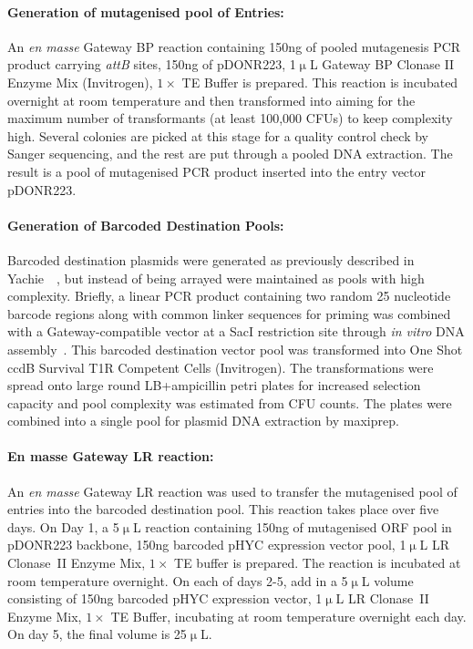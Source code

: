 \paragraph{Generation of mutagenised pool of Entries:} An \textit{en masse} Gateway BP reaction containing 150ng of pooled mutagenesis PCR product carrying \textit{attB} sites, 150ng of pDONR223, 1$\upmu$L Gateway BP Clonase II Enzyme Mix (Invitrogen), $1\times$ TE Buffer is prepared. This reaction is incubated overnight at room temperature and then transformed into  aiming for the maximum number of transformants (at least 100,000 CFUs) to keep complexity high. Several colonies are picked at this stage for a quality control check by Sanger sequencing, and the rest are put through a pooled DNA extraction. The result is a pool of mutagenised PCR product inserted into the entry vector pDONR223.

\paragraph{Generation of Barcoded Destination Pools:} Barcoded destination plasmids were generated as previously described in Yachie~\etal\ \cite{yachie_pooledmatrix_2016}, but instead of being arrayed were maintained as pools with high complexity. Briefly, a linear PCR product containing two random 25 nucleotide barcode regions along with common linker sequences for priming was combined with a Gateway-compatible vector at a SacI restriction site through \textit{in vitro} DNA assembly~\cite{gibson_enzymatic_2009}. This barcoded destination vector pool was transformed into One Shot ccdB Survival T1R Competent Cells (Invitrogen). The transformations were spread onto large round LB+ampicillin petri plates for increased selection capacity and pool complexity was estimated from CFU counts. The plates were combined into a single pool for plasmid DNA extraction by maxiprep.

\paragraph{En masse Gateway LR reaction:} An \textit{en masse} Gateway LR reaction was used to transfer the mutagenised pool of entries into the barcoded destination pool. This reaction takes place over five days. On Day 1, a 5$\upmu$L reaction containing 150ng of mutagenised ORF pool in pDONR223 backbone, 150ng barcoded pHYC expression vector pool, 1$\upmu$L LR Clonase II Enzyme Mix, $1\times$ TE buffer is prepared. The reaction is incubated at room temperature overnight. On each of days 2-5, add in a 5$\upmu$L volume consisting of 150ng barcoded pHYC expression vector, 1$\upmu$L LR Clonase II Enzyme Mix, $1\times$ TE Buffer, incubating at room temperature overnight each day. On day 5, the final volume is 25$\upmu$L. 


